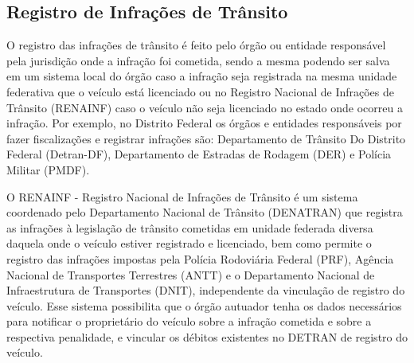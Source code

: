 \subsection{Registro de Infrações de Trânsito}
\label{section_renainf}


    O registro das infrações de trânsito é feito pelo órgão ou entidade responsável pela jurisdição onde a infração foi cometida, sendo a mesma podendo ser salva em um sistema local do órgão caso a infração seja registrada na mesma unidade federativa que o veículo está licenciado ou no Registro Nacional de Infrações de Trânsito (RENAINF) caso o veículo não seja licenciado no estado onde ocorreu a infração. Por exemplo, no Distrito Federal os órgãos e entidades responsáveis por fazer fiscalizações e registrar infrações são: Departamento de Trânsito Do Distrito Federal (Detran-DF), Departamento de Estradas de Rodagem (DER) e Polícia Militar (PMDF).
    
    O RENAINF - Registro Nacional de Infrações de Trânsito é um sistema coordenado pelo Departamento Nacional de Trânsito (DENATRAN) que registra as infrações à legislação de trânsito cometidas em unidade federada diversa daquela onde o veículo estiver registrado e licenciado, bem como permite o registro das infrações impostas pela Polícia Rodoviária Federal (PRF), Agência Nacional de Transportes Terrestres (ANTT) e o Departamento Nacional de Infraestrutura de Transportes (DNIT), independente da vinculação de registro do veículo. Esse sistema possibilita que o órgão autuador tenha os dados necessários para notificar o proprietário do veículo sobre a infração cometida e sobre a respectiva penalidade, e vincular os débitos existentes no DETRAN de registro do veículo.\cite{renainf_fazenda_sp}
